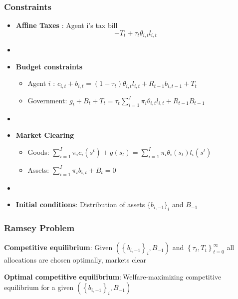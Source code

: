 \documentclass{beamer}
\begin{document}
\begin{frame}
 \frametitle{Constraints}
 \begin{itemize}
  \item \textbf{Affine Taxes }: Agent i's tax bill
\[- T_t + \tau_t \theta_{i,t}l_{i,t}\]

\item[]
  \item \textbf{Budget constraints}
  \begin{itemize}
   \item Agent $i$ : $ c_{i,t}+b_{i,t}=\left( 1-\tau _{t}\right) \theta _{i,t}l_{i,t}+R_{t-1}b_{i,t-1}+T_{t}$
\item Government: $g_{t}+B_{t}+T_t=\tau _{t}\sum_{i=1}^{I}\pi _{i}\theta_{i,t}l_{i,t}+R_{t-1}B_{t-1}$
  \end{itemize}

\item[]
  \item \textbf{Market Clearing}
  \begin{itemize}
   \item Goods: $\sum_{i=1}^{I}\pi_{i}c_{i}(s^t)+g\left( s_{t}\right) =\sum_{i=1}^{I}\pi
_{i}\theta _{i}\left( s_{t}\right) l_{i}(s^t)$

   \item Assets: $\sum_{i=1}^{I}\pi _{i}b_{i,t}+B_{t}=0$
 
  \end{itemize}
  \item[]

\item \textbf{Initial conditions}: Distribution of assets $\{b_{i,-1}\}_i$ and $B_{-1}$  
\end{itemize}
\end{frame}


\begin{frame}
 \frametitle{Ramsey Problem} 

\begin{definition}
\textbf{Competitive equilibrium}: Given $\left( \left\{ b_{i,-1}\right\}
_{i},B_{-1}\right) $ and $\left\{ \tau _{t},T_{t}\right\} _{t=0}^{\infty }$
all allocations are chosen optimally, markets clear
\end{definition}

\begin{definition}
\textbf{Optimal competitive equilibrium}:$\ $Welfare-maximizing competitive
equilibrium for a given $\left( \left\{ b_{i,-1}\right\} _{i},B_{-1}\right) $
\end{definition}

 \end{frame}
\end{document}
